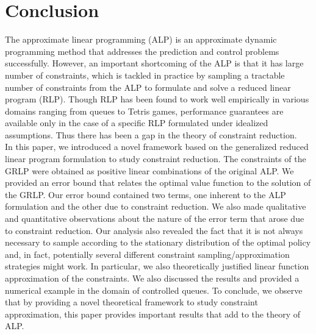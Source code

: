 \documentclass[12pt,draftcls,onecolumn]{IEEEtran}
\begin{document}
\section{Conclusion}
The approximate linear programming (ALP) is an approximate dynamic programming method that addresses the prediction and control problems successfully. However, an important shortcoming of the ALP is that it has large number of constraints, which is tackled in practice by sampling a tractable number of constraints from the ALP to formulate and solve a reduced linear program (RLP). Though RLP has been found to work well empirically in various domains ranging from queues to Tetris games, performance guarantees are available only in the case of a specific RLP formulated under idealized assumptions. Thus there has been a gap in the theory of constraint reduction.\\
In this paper, we introduced a novel framework based on the generalized reduced linear program formulation to study constraint reduction. The constraints of the GRLP were obtained as positive linear combinations of the original ALP. We provided an error bound that relates the optimal value function to the solution of the GRLP. Our error bound contained two terms, one inherent to the ALP formulation and the other due to constraint reduction. We also made qualitative and quantitative observations about the nature of the error term that arose due to constraint reduction. Our analysis also revealed the fact that it is not always necessary to sample according to the stationary distribution of the optimal policy and, in fact, potentially several different constraint sampling/approximation strategies might work. In particular, we also theoretically justified linear function approximation of the constraints. We also discussed the results and provided a numerical example in the domain of controlled queues. To conclude, we observe that by providing a novel theoretical framework to study constraint approximation, this paper provides important results that add to the theory of ALP.



\newpage
\onecolumn
\end{document}
